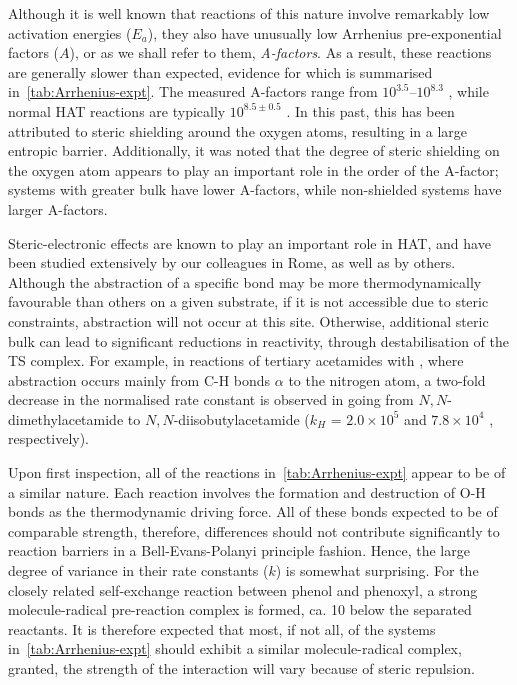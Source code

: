 Although it is well known that reactions of this nature involve remarkably low activation energies ($E_a$),\cite{Lucarini1996,Mahoney1970a,Mahoney1975,Korcek1972} they also have unusually low Arrhenius pre-exponential factors ($A$), or as we shall refer to them, \emph{A-factors}. As a result, these reactions are generally slower than expected, evidence for which is summarised in~\ref{tab:Arrhenius-expt}.
The measured A-factors range from $10^{3.5}$--$10^{8.3}$ \Ms, while normal HAT reactions are typically $10^{8.5\pm0.5}$ \Ms.\cite{Benson1976} In this past,  this has been attributed to steric shielding around the oxygen atoms, resulting in a large entropic barrier.\cite{DiLabio2005} Additionally, it was noted that the degree of steric shielding on the oxygen atom appears to play an important role in the order of the A-factor; systems with greater bulk have lower A-factors, while non-shielded systems have larger A-factors.

Steric-electronic effects are known to play an important role in HAT, and have been studied extensively by our colleagues in Rome, as well as by others.\cite{Finn2004,Salamone2011,Pischel2001,Griller1981,Bietti2011, Salamone2012,Malatesta1982,Salamone2014} Although the abstraction of a specific bond may be more thermodynamically favourable than others on a given substrate, if it is not accessible due to steric constraints, abstraction will not occur at this site. Otherwise, additional steric bulk can lead to significant reductions in reactivity, through destabilisation of the TS complex. For example, in reactions of tertiary acetamides with \cumo,\cite{Salamone2014} where abstraction occurs mainly from C-H bonds $\alpha$ to the nitrogen atom, a two-fold decrease in the normalised rate constant is observed in going from $N,N$-dimethylacetamide to $N,N$-diisobutylacetamide ($k_H$ = $2.0 \times 10^5$ and $7.8 \times 10^4$ \Ms, respectively).

Upon first inspection, all of the reactions in~\ref{tab:Arrhenius-expt} appear to be of a similar nature. Each reaction involves the formation and destruction of O-H bonds as the thermodynamic driving force. All of these bonds expected to be of comparable strength, therefore, differences should not contribute significantly to reaction barriers in a Bell-Evans-Polanyi principle fashion. Hence, the large degree of variance in their rate constants ($k$) is somewhat surprising. For the closely related self-exchange reaction between phenol and phenoxyl,\cite{Mayer2002} a strong molecule-radical pre-reaction complex is formed, ca. 10 \kcalmol below the separated reactants. It is therefore expected that most, if not all, of the systems in~\ref{tab:Arrhenius-expt} should exhibit a similar molecule-radical complex, granted, the strength of the interaction will vary because of steric repulsion.

